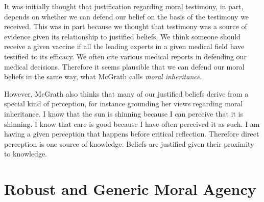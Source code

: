 \documentclass[phdthesis,12pt,final]{wuthesis}
\theoremstyle{definition}
\theoremstyle{definition}
\theoremstyle{definition}
\theoremstyle{definition}
\theoremstyle{remark}
\begin{document}
\begin{Shaded}
\begin{Highlighting}[]

\end{Highlighting}
\end{Shaded}

\begin{Shaded}
\begin{Highlighting}[]

\end{Highlighting}
\end{Shaded}

It was initially thought that justification regarding moral testimony, in part, depends on whether we can defend our belief on the basis of the testimony we received. This was in part because we thought that testimony was a source of evidence given its relationship to justified beliefs. We think someone should receive a given vaccine if all the leading experts in a given medical field have testified to its efficacy. We often cite various medical reports in defending our medical decisions. Therefore it seems plausible that we can defend our moral beliefs in the same way, what McGrath calls \emph{moral inheritance}.

However, McGrath also thinks that many of our justified beliefs derive from a special kind of perception, for instance grounding her views regarding moral inheritance. I know that the sun is shinning because I can perceive that it is shinning. I know that care is good because I have often perceived it as such. I am having a given perception that happens before critical reflection. Therefore direct perception is one source of knowledge. Beliefs are justified given their proximity to knowledge.

\chapter{Robust and Generic Moral Agency}\label{robust-and-generic-moral-agency}
\end{document}
